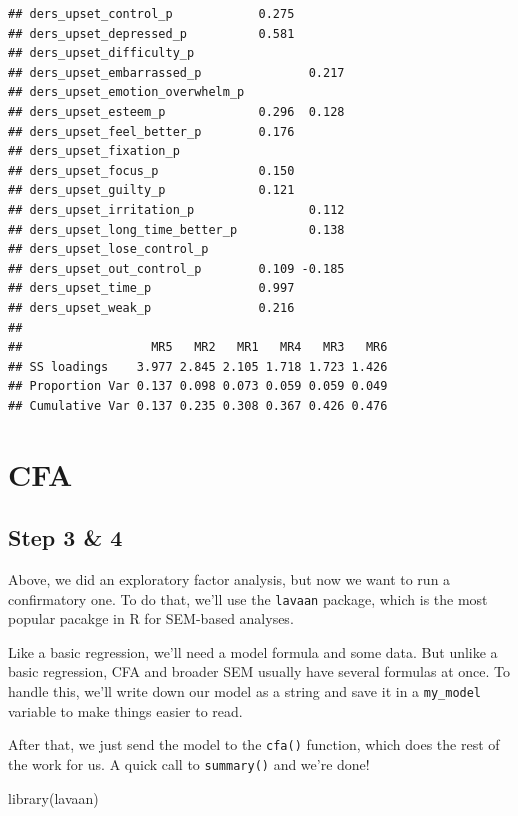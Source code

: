 \documentclass[
]{book}
\newenvironment{Shaded}{\begin{snugshade}}{\end{snugshade}}
\newcommand{\FunctionTok}[1]{\textcolor[rgb]{0.00,0.00,0.00}{#1}}
\newcommand{\NormalTok}[1]{#1}
\begin{document}
\begin{verbatim}
## ders_upset_control_p            0.275       
## ders_upset_depressed_p          0.581       
## ders_upset_difficulty_p                     
## ders_upset_embarrassed_p               0.217
## ders_upset_emotion_overwhelm_p              
## ders_upset_esteem_p             0.296  0.128
## ders_upset_feel_better_p        0.176       
## ders_upset_fixation_p                       
## ders_upset_focus_p              0.150       
## ders_upset_guilty_p             0.121       
## ders_upset_irritation_p                0.112
## ders_upset_long_time_better_p          0.138
## ders_upset_lose_control_p                   
## ders_upset_out_control_p        0.109 -0.185
## ders_upset_time_p               0.997       
## ders_upset_weak_p               0.216       
## 
##                  MR5   MR2   MR1   MR4   MR3   MR6
## SS loadings    3.977 2.845 2.105 1.718 1.723 1.426
## Proportion Var 0.137 0.098 0.073 0.059 0.059 0.049
## Cumulative Var 0.137 0.235 0.308 0.367 0.426 0.476
\end{verbatim}

\hypertarget{cfa}{%
\section{CFA}\label{cfa}}

\hypertarget{step-3-4}{%
\subsection{Step 3 \& 4}\label{step-3-4}}

Above, we did an exploratory factor analysis, but now we want to run a confirmatory one. To do that, we'll use the \texttt{lavaan} package, which is the most popular pacakge in R for SEM-based analyses.

Like a basic regression, we'll need a model formula and some data. But unlike a basic regression, CFA and broader SEM usually have several formulas at once. To handle this, we'll write down our model as a string and save it in a \texttt{my\_model} variable to make things easier to read.

After that, we just send the model to the \texttt{cfa()} function, which does the rest of the work for us. A quick call to \texttt{summary()} and we're done!

\begin{Shaded}
\begin{Highlighting}[]
\FunctionTok{library}\NormalTok{(lavaan)}
\end{Highlighting}
\end{Shaded}
\end{document}
